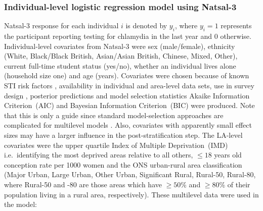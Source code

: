 \documentclass[fleqn,10pt]{wlscirep}
\begin{document}
\subsubsection*{Individual-level logistic regression model using Natsal-3}
Natsal-3 response for each individual $i$ is denoted by $y_i$, where $y_i = 1$ represents the participant reporting testing for chlamydia in the last year and 0 otherwise. 
Individual-level covariates from Natsal-3 were sex (male/female), ethnicity (White, Black/Black British, Asian/Asian British, Chinese, Mixed, Other), current full-time student status (yes/no), whether an individual lives alone (household size one) and age (years). Covariates were chosen because of known STI risk factors \cite{Waroux2014}, availability in individual and area-level data sets, use in survey design \cite{Erens2014b}, posterior predictions and model selection statistics Akaike Information Criterion~(AIC) and Bayesian Information Criterion~(BIC) \cite{Gelman2007} were produced. Note that this is only a guide since standard model-selection approaches are complicated for multilevel models \cite{Molenberghs2016}. Also, covariates with apparently small effect sizes may have a larger influence in the post-stratification step.
The LA-level covariates were the upper quartile Index of Multiple Deprivation~(IMD) i.e.\ identifying the most deprived areas relative to all others, $\leq 18$ years old conception rate per 1000 women and the ONS urban-rural area classification (Major Urban, Large Urban, Other Urban, Significant Rural, Rural-50, Rural-80, where Rural-50 and -80 are those areas which have $\geq 50$\% and $\geq 80$\% of their population living in a rural area, respectively). 
These multilevel data were used in the model:
\end{document}
